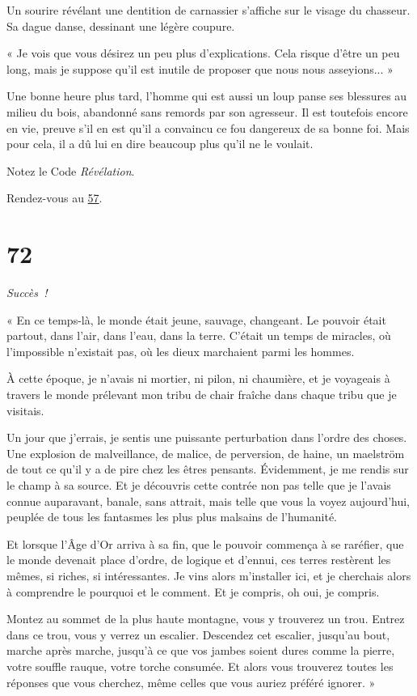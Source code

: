 \documentclass{report}
\newcommand{\gsection}[1]{
    \section{#1}
    \label{section-#1}
}
\newcommand{\glink}[1]{\hyperref[section-#1]{#1}}
\newcommand{\success}{
    \emph{Succès !}
}
\begin{document}
Un sourire révélant une dentition de carnassier s'affiche sur le visage du chasseur. Sa dague danse, dessinant une légère coupure.

« Je vois que vous désirez un peu plus d'explications. Cela risque d'être un peu long, mais je suppose qu'il est inutile de proposer que nous nous asseyions... » 

Une bonne heure plus tard, l'homme qui est aussi un loup panse ses blessures au milieu du bois, abandonné sans remords par son agresseur. Il est toutefois encore en vie, preuve s'il en est qu'il a convaincu ce fou dangereux de sa bonne foi. Mais pour cela, il a dû lui en dire beaucoup plus qu'il ne le voulait.

Notez le Code \emph{Révélation}.

Rendez-vous au \glink{57}.

\gsection{72}

\success

« En ce temps-là, le monde était jeune, sauvage, changeant. Le pouvoir était partout, dans l'air, dans l'eau, dans la terre. C'était un temps de miracles, où l'impossible n'existait pas, où les dieux marchaient parmi les hommes.

À cette époque, je n'avais ni mortier, ni pilon, ni chaumière, et je voyageais à travers le monde prélevant mon tribu de chair fraîche dans chaque tribu que je visitais.

Un jour que j'errais, je sentis une puissante perturbation dans l'ordre des choses. Une explosion de malveillance, de malice, de perversion, de haine, un maelström de tout ce qu'il y a de pire chez les êtres pensants. Évidemment, je me rendis sur le champ à sa source. Et je découvris cette contrée non pas telle que je l'avais connue auparavant, banale, sans attrait, mais telle que vous la voyez aujourd'hui, peuplée de tous les fantasmes les plus plus malsains de l'humanité.

Et lorsque l'Âge d'Or arriva à sa fin, que le pouvoir commença à se raréfier, que le monde devenait place d'ordre, de logique et d'ennui, ces terres restèrent les mêmes, si riches, si intéressantes. Je vins alors m'installer ici, et je cherchais alors à comprendre le pourquoi et le comment. Et je compris, oh oui, je compris.

Montez au sommet de la plus haute montagne, vous y trouverez un trou. Entrez dans ce trou, vous y verrez un escalier. Descendez cet escalier, jusqu'au bout, marche après marche, jusqu'à ce que vos jambes soient dures comme la pierre, votre souffle rauque, votre torche consumée. Et alors vous trouverez toutes les réponses que vous cherchez, même celles que vous auriez préféré ignorer. »
\end{document}
